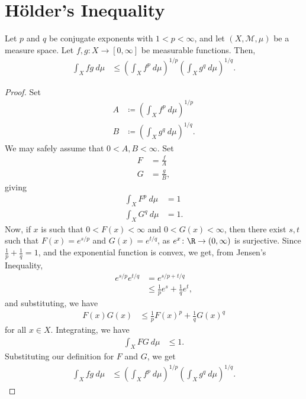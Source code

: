\documentclass[12pt]{mypackage}
\begin{document}
\section{Hölder's Inequality}%
\begin{theorem}
  Let $p$ and $q$ be conjugate exponents with $1 < p < \infty$, and let $\left( X,\mathcal{M},\mu \right)$ be a measure space. Let $f,g\colon X\rightarrow [0,\infty]$ be measurable functions. Then,
  \begin{align*}
    \int_{X}^{} fg\:d\mu &\leq \left( \int_{ X }^{} f^{p}\:d\mu \right)^{1/p}\left( \int_{X}^{} g^{q}\:d\mu \right)^{1/q}.
  \end{align*}
\end{theorem}
\begin{proof}
  Set
  \begin{align*}
    A &\coloneq \left( \int_{X}^{} f^{p}\:d\mu \right)^{1/p}\\
    B &\coloneq \left( \int_{X}^{} g^{q}\:d\mu \right)^{1/q}.
  \end{align*}
  We may safely assume that $0 < A,B < \infty$. Set
  \begin{align*}
    F &= \frac{f}{A}\\
    G &= \frac{g}{B},
  \end{align*}
  giving
  \begin{align*}
    \int_{X}^{} F^{p}\:d\mu &= 1\\
    \int_{X}^{} G^{q}\:d\mu &= 1.
  \end{align*}
  Now, if $x$ is such that $0 < F(x) < \infty$ and $0 < G(x) < \infty$, then there exist $s,t$ such that $F(x) = e^{s/p}$ and $G(x) = e^{t/q}$, as $e^{x}\colon \R\rightarrow (0,\infty)$ is surjective. Since $\frac{1}{p} + \frac{1}{q} = 1$, and the exponential function is convex, we get, from Jensen's Inequality,
  \begin{align*}
    e^{s/p}e^{t/q} &= e^{s/p + t/q}\\
                   &\leq \frac{1}{p}e^{s} + \frac{1}{q}e^{t},
  \end{align*}
  and substituting, we have
  \begin{align*}
    F(x)G(x) &\leq \frac{1}{p}F(x)^{p} + \frac{1}{q}G(x)^{q}
  \end{align*}
  for all $x\in X$. Integrating, we have
  \begin{align*}
    \int_{X}^{} FG\:d\mu &\leq 1.
  \end{align*}
  Substituting our definition for $F$ and $G$, we get
  \begin{align*}
    \int_{X}^{} fg\:d\mu &\leq \left( \int_{X}^{} f^p\:d\mu \right)^{1/p} \left( \int_{X}^{} g^{q}\:d\mu \right)^{1/q}.
  \end{align*}
\end{proof}
\end{document}

